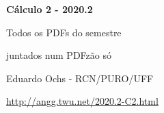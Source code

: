 \documentclass[oneside,12pt]{article}
\begin{document}

\def\drafturl{http://angg.twu.net/LATEX/2020-2-C2.pdf}
\def\drafturl{http://angg.twu.net/2020.2-C2.html}
\def\draftfooter{\tiny \href{\drafturl}{\jobname{}} \ColorBrown{\shorttoday{} \hours}}



%

\thispagestyle{empty}

\begin{center}

\vspace*{1.2cm}

{\bf \Large Cálculo 2 - 2020.2}

\bsk

Todos os PDFs do semestre

juntados num PDFzão só

\bsk

Eduardo Ochs - RCN/PURO/UFF

\url{http://angg.twu.net/2020.2-C2.html}

\end{center}

\newpage

\def\incl#1{}

\incl{2020-2-C2-intro}

\incl{2020-2-C2-somas-1}

\incl{2020-2-C2-somas-2}

\incl{2020-2-C2-escadas}

\incl{2020-2-C2-MT1}
\end{document}
